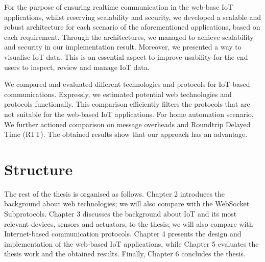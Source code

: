 For the purpose of ensuring realtime communication in the web-base IoT applications, whilst reserving scalability and security, we developed a scalable and robust architecture for each scenario of the aforementioned applications, based on each requirement. Through the architectures, we managed to achieve scalability and security in our implementation result. Moreover, we presented a way to visualise IoT data. This is an essential aspect to improve usability for the end users to inspect, review and manage IoT data.

We compared and evaluated different technologies and protocols for IoT-based communications. Expressly, we estimated potential web technologies and protocols functionally. This comparison efficiently filters the protocols that are not suitable for the web-based IoT applications. For home automation scenario, We further actioned comparison on message overheads and Roundtrip Delayed Time (RTT). The obtained results show that our approach has an advantage.

\section{Structure}

The rest of the thesis is organised as follows. Chapter 2 introduces the background about web technologies; we will also compare with the WebSocket Subprotocols. Chapter 3 discusses the  background about IoT and its most relevant devices, sensors and actuators, to the thesis; we will also compare with Internet-based communication protocols. Chapter 4 presents the design and implementation of the web-based IoT applications, while Chapter 5 evaluates the thesis work and the obtained results. Finally, Chapter 6 concludes the thesis. 
